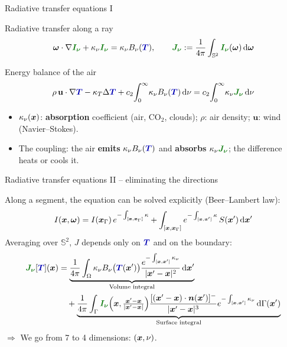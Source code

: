 \documentclass[8pt, xcolor=table,aspectratio=169]{beamer}
\begin{document}
\begin{frame}{\textcolor{activecolor}{Radiative transfer equations I}}

  \begin{block}{Radiative transfer along a ray}
    \[
      \bol{\omega}\cdot\nabla \intensity + \kappa_\nu \intensity = \kappa_\nu B_\nu(\temperature),
      \qquad \jintensity := \frac{1}{4\pi}\int_{\mathbb{S}^2} \intensity(\bol{\omega})\dd\bol{\omega}
    \]
  \end{block}
  \medskip 
  \begin{block}{Energy balance of the air}
    \[
      \rho\,\mathbf{u}\cdot\nabla \temperature - \kappa_T\Delta \temperature
      + c_2\!\int_0^\infty\!\kappa_\nu B_\nu(\temperature)\dd\nu
      = c_2\!\int_0^\infty\!\kappa_\nu \jintensity\dd\nu
    \]
  \end{block}
  \medskip
  \begin{itemize}[label=$\square$]\setlength\itemsep{0.8em}
    \item $\kappa_\nu(\boldsymbol{x})$: \textbf{absorption} coefficient (air, CO$_2$, clouds); $\rho$: air density; $\mathbf{u}$: wind (Navier--Stokes).
    \item The coupling: the air \textbf{emits} $\kappa_\nu B_\nu(\temperature)$ and \textbf{absorbs} $\kappa_\nu \jintensity$; the difference heats or cools it.
  \end{itemize}
\end{frame}
\begin{frame}{\textcolor{activecolor}{Radiative transfer equations II -- eliminating the directions}}
  
  Along a segment, the equation can be solved explicitly (Beer--Lambert law):
  \[
    I(\boldsymbol{x},\boldsymbol{\omega}) = I(\boldsymbol{x}_\Gamma)\,e^{-\int_{[\boldsymbol{x},\boldsymbol{x}_\Gamma]}\kappa}
    + \int_{[\boldsymbol{x},\boldsymbol{x}_\Gamma]} e^{-\int_{[\boldsymbol{x},\boldsymbol{x}']}\kappa}\,S(\boldsymbol{x}')\,\mathrm{d}\boldsymbol{x}'
  \]
  Averaging over $\mathbb{S}^2$, $J$ depends only on $\temperature$ and on the boundary:
  \begin{align*}
    \jintensity[\temperature](\bol{x}) &= \underbrace{\frac{1}{4\pi}\int_\Omega \kappa_\nu B_\nu\big(\temperature(\bol{x}')\big)\frac{e^{-\int_{[\bol{x},\bol{x}']}\kappa_\nu}}{|\bol{x}'-\bol{x}|^2}\dd\bol{x}'}_{\text{Volume integral}}\\
    &\quad+ \underbrace{\frac{1}{4\pi}\int_\Gamma \intensity\Big(\bol{x},\tfrac{\bol{x}'-\bol{x}}{|\bol{x}'-\bol{x}|}\Big)\frac{[(\bol{x}'-\bol{x})\cdot\bol{n}(\bol{x}')]^-}{|\bol{x}'-\bol{x}|^3}e^{-\int_{[\bol{x},\bol{x}']}\kappa_\nu}\dd\Gamma(\bol{x}')}_{\text{Surface integral}}
  \end{align*}
  \alert{ $\Longrightarrow$ We go from 7 to 4 dimensions: $(\boldsymbol{x},\nu)$.}
\end{frame}
\end{document}
